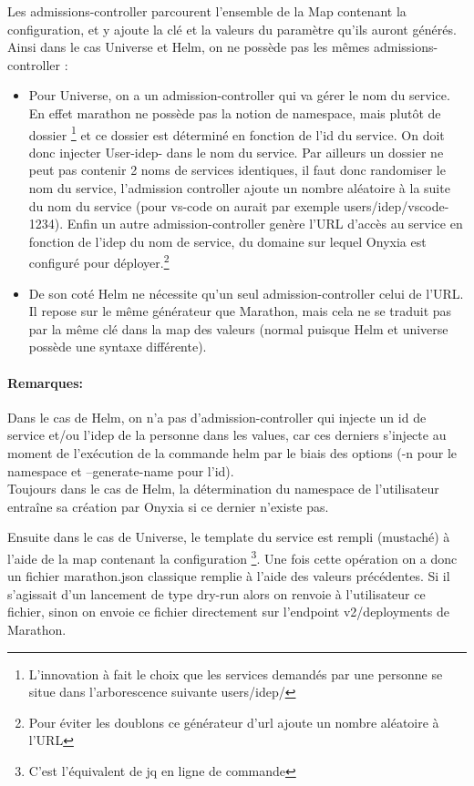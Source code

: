 \documentclass[11pt,fleqn]{book} %
\begin{document}
Les admissions-controller parcourent l'ensemble de la Map contenant la configuration, et y ajoute la clé et la valeurs du paramètre qu'ils auront générés. Ainsi dans le cas Universe et Helm, on ne possède pas les mêmes admissions-controller : \begin{itemize}
    \item Pour Universe, on a un admission-controller qui va gérer le nom du service. En effet marathon ne possède pas la notion de namespace, mais plutôt de dossier \footnote{L'innovation à fait le choix que les services demandés par une personne se situe dans l'arborescence suivante users/idep/} et ce dossier est déterminé en fonction de l'id du service. On doit donc injecter User-idep- dans le nom du service. Par ailleurs un dossier ne peut pas contenir 2 noms de services identiques, il faut donc randomiser le nom du service, l'admission controller ajoute un nombre aléatoire à la suite du nom du service (pour vs-code on aurait par exemple users/idep/vscode-1234). Enfin un autre admission-controller genère l'URL d'accès au service en fonction de l'idep du nom de service, du domaine sur lequel Onyxia est configuré pour déployer.\footnote{Pour éviter les doublons ce générateur d'url ajoute un nombre aléatoire à l'URL}
    \item De son coté Helm ne nécessite qu'un seul admission-controller celui de l'URL. Il repose sur le même générateur que Marathon, mais cela ne se traduit pas par la même clé dans la map des valeurs (normal puisque Helm et universe possède une syntaxe différente).
\end{itemize}

\begin{interrupt}
\paragraph{Remarques:}
 Dans le cas de Helm, on n'a pas d'admission-controller qui injecte un id de service et/ou l'idep de la personne dans les values, car ces derniers s'injecte au moment de l'exécution de la commande helm par le biais des options (-n pour le namespace et --generate-name pour l'id). \\
 Toujours dans le cas de Helm, la détermination du namespace de l'utilisateur entraîne sa création par Onyxia si ce dernier n'existe pas.
\end{interrupt}
Ensuite dans le cas de Universe, le template du service est rempli (mustaché) à l'aide de la map contenant la configuration \footnote{C'est l'équivalent de jq en ligne de commande}. Une fois cette opération on a donc un fichier marathon.json classique remplie à l'aide des valeurs précédentes. Si il s'agissait d'un lancement de type dry-run alors on renvoie à l'utilisateur ce fichier, sinon on envoie ce fichier directement sur l'endpoint v2/deployments de Marathon.\\
\end{document}
